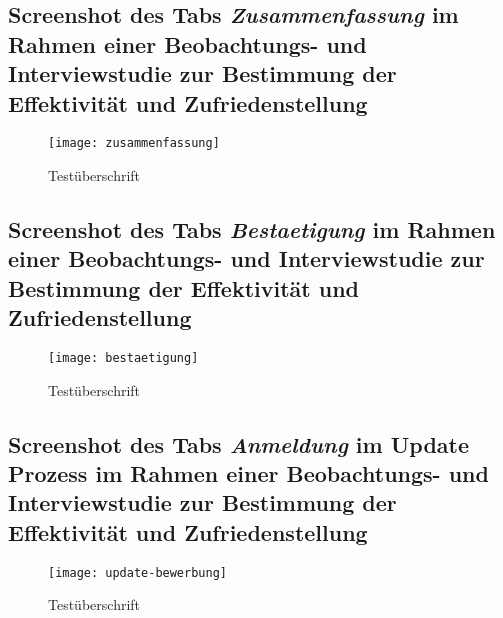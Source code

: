 \begin{landscape}
    \subsection{Screenshot des Tabs \textit{Zusammenfassung} im Rahmen einer Beobachtungs- und Interviewstudie zur Bestimmung der Effektivität und Zufriedenstellung}
    \label{section-zusammenfassung}
    \begin{figure}[H]
        \centering
        \caption{Testüberschrift}
        \begin{adjustbox}{width=\linewidth, center}
            \texttt{[image: zusammenfassung]}
        \end{adjustbox}
    \end{figure}

    \subsection{Screenshot des Tabs \textit{Bestaetigung} im Rahmen einer Beobachtungs- und Interviewstudie zur Bestimmung der Effektivität und Zufriedenstellung}
    \label{section-bestaetigung}
    \begin{figure}[H]
        \centering
        \caption{Testüberschrift}
        \begin{adjustbox}{width=\linewidth, center}
            \texttt{[image: bestaetigung]}
        \end{adjustbox}
    \end{figure}

    \subsection{Screenshot des Tabs \textit{Anmeldung} im Update Prozess im Rahmen einer Beobachtungs- und Interviewstudie zur Bestimmung der Effektivität und Zufriedenstellung}
    \label{section-update-anmeldung}
    \begin{figure}[H]
        \centering
        \caption{Testüberschrift}
        \begin{adjustbox}{width=\linewidth, center}
            \texttt{[image: update-bewerbung]}
        \end{adjustbox}
    \end{figure}

\end{landscape}
